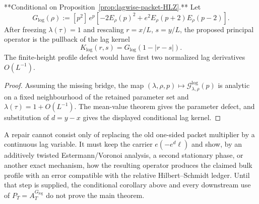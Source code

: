 \begin{corollary}
\label{cor:frozen-logonly-lag-kernel}
**Conditional on Proposition~\ref{prop:lagwise-packet-HLZ}.**  Let
\begin{equation}
\boxed{
G_{\log}(\rho):=[p^2]\,
 e^p\left[-2E_\rho(p)^2+e^2E_\rho(p+2)E_\rho(p-2)\right].
}
\label{eq:Glog-from-source}
\end{equation}
After freezing $\lambda(\tau)=1$ and rescaling $r=x/L$, $s=y/L$, the proposed
principal operator is the pullback of the lag kernel
\begin{equation}
\boxed{K_{\log}(r,s)=G_{\log}(1-|r-s|).}
\label{eq:Klog-lag-kernel}
\end{equation}
The finite-height profile defect would have first two normalized lag
derivatives $O(L^{-1})$.
\end{corollary}

\begin{proof}
Assuming the missing bridge, the map
$(\lambda,\rho,p)\mapsto\mathcal G^{\log}_{\lambda,\rho}(p)$ is analytic on a
fixed neighbourhood of the retained parameter set and
$\lambda(\tau)=1+O(L^{-1})$.  The mean-value theorem gives the parameter defect,
and substitution of $d=y-x$ gives the displayed conditional lag kernel.
\end{proof}

\begin{remark}
A repair cannot consist only of replacing the old one-sided packet multiplier
by a continuous lag variable.  It must keep the carrier
$e(-e^d\ell)$ and show, by an additively twisted Estermann/Voronoi analysis, a
second stationary phase, or another exact mechanism, how the resulting
operator produces the claimed bulk profile with an error compatible with the
relative Hilbert--Schmidt ledger.  Until that step is supplied, the conditional
corollary above and every downstream use of $P_T=A_T^{G_{\log}}$ do not prove
the main theorem.
\end{remark}
